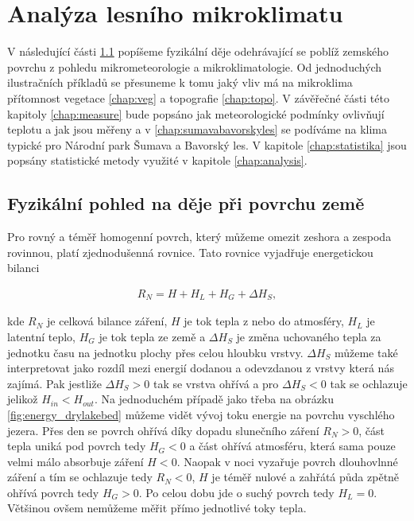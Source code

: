 \chapter{Analýza lesního mikroklimatu}
\label{chap:ch1}

V následující části \ref{chap:fyz} popíšeme fyzikální děje odehrávající se poblíž zemského povrchu z pohledu mikrometeorologie a mikroklimatologie. Od jednoduchých ilustračních příkladů se přesuneme k tomu jaký vliv má na mikroklima přítomnost vegetace \ref{chap:veg} a topografie \ref{chap:topo}. V závěřečné části této kapitoly \ref{chap:measure} bude popsáno jak meteorologické podmínky ovlivňují teplotu a jak jsou měřeny a v \ref{chap:sumavabavorskyles} se podíváme na klima typické pro Národní park Šumava a Bavorský les. V kapitole \ref{chap:statistika} jsou popsány statistické metody využité v kapitole \ref{chap:analysis}.

\section{Fyzikální pohled na děje při povrchu země} \label{chap:fyz}
Pro rovný a téměř homogenní povrch, který můžeme omezit zeshora a zespoda rovinnou, platí zjednodušenná rovnice. Tato rovnice vyjadřuje energetickou bilanci\cite{arya2001}

\begin{gather}\label{eq:bilance}
R_N = H + H_L + H_G + \Delta H_S,
\end{gather}

kde $R_N$ je celková bilance záření, $H$ je tok tepla z nebo do atmosféry, $H_L$ je latentní teplo, $H_G$ je tok tepla ze země a $\Delta H_S$ je změna uchovaného tepla za jednotku času na jednotku plochy přes celou hloubku vrstvy. $\Delta H_S$ můžeme také interpretovat jako rozdíl mezi energií dodanou a odevzdanou z vrstvy která nás zajímá. Pak jestliže $\Delta H_S>0$ tak se vrstva ohřívá a pro $\Delta H_S<0$ tak se ochlazuje jelikož $H_{in}<H_{out}$. Na jednoduchém případě jako třeba na obrázku \ref{fig:energy_drylakebed} můžeme vidět vývoj toku energie na povrchu vyschlého jezera. Přes den se povrch ohřívá díky dopadu slunečního záření $R_N>0$, část tepla uniká pod povrch tedy $H_G<0$ a část ohřívá atmosféru, která sama pouze velmi málo absorbuje záření $H<0$. Naopak v noci vyzařuje povrch dlouhovlnné záření a tím se ochlazuje tedy $R_N<0$, $H$ je téměř nulové a zahřátá půda zpětně ohřívá povrch tedy $H_G>0$. Po celou dobu jde o suchý povrch tedy $H_L=0$\cite{arya2001}. Většinou ovšem nemůžeme měřit přímo jednotlivé toky tepla.

